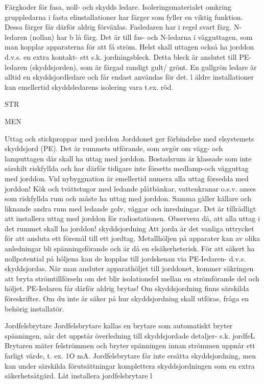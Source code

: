 Färgkoder för fasa, noll- och skydds ledare.
Isoleringsmaterialet omkring gruppledarna i
fasta elinstallationer har färger som fyller en
viktig funktion. Dessa färger får därför aldrig
förväxlas.
Fasledaren har i regel svart färg. N-ledaren (nollan) har b lå färg.
Det är till fas- och N-ledarna i vägguttagen, som man kopplar apparaterna för att få
ström. Helst skall uttagen också ha jorddon
d.v.s. en extra kontakt- ett s.k. jordningsbleck. Detta bleck är anslutet till PE-ledaren
(skyddsjorden), som är färgad randigt gult/
grönt.
En gullgrön ledare är alltid en skyddsjordledare och får endast användas för det.
l äldre installationer kan emellertid skyddsledarens isolering vara t.ex. röd.

STR

MEN

Uttag och stickproppar med jorddon
Jorddonet ger förbindelse med elsystemets
skyddsjord (PE).
Det är rummets utförande, som avgör om
vägg- och lamputtagen där skall ha uttag
med jorddon. Bostadsrum är klassade som
inte särskilt riskfyllda och har därför tidigare
inte försetts medlamp-och vägguttag med
jorddon. Vid nybyggnation är emellertid numera alla uttag försedda med jorddon!
Kök och tvättstugor med ledande plåtbänkar, vattenkranar o.s.v. anses som riskfyllda rum och måste ha uttag med jorddon.
Samma gäller källare och liknande andra
rum med ledande golv, väggar och inredningar.
Det är tillrådligt att installera uttag med
jorddon för radiostationen. Observera då, att
alla uttag i det rummet skall ha jorddon!
skyddsjordning
Att jorda är det vanliga uttrycket för att ansluta ett föremål till ett jordtag. Metallhöljen
på apparater kan av olika anledningar bli
spänningsförande och är då en elsäkerhetsrisk. För att säkert ha nollpotential på höljena
kan de kopplas till jordskenan via PE-Iedaren- d.v.s. skyddsjordas. När man ansluter
apparathöljet till jorddonet, kommer
säkringen att bryta strömtillförseln om det
blir isolationsfel mellan en strömförande del
och höljet. PE-Iedaren får därför aldrig brytas!
Om skyddsjordning finns särskilda föreskrifter. Om du inte är säker på hur skyddsjordning skall utföras, fråga en behörig installatör.

Jordfelsbrytare
Jordfelsbrytare kallas en brytare som automatiskt bryter spänningen, när det uppstår
överledning till skyddsjordade detaljer- s.k.
jordfeL Brytaren mäter felströmmen och bryter spänningen innan strömmen uppnår ett
farligt värde, t. ex. 1O mA. Jordfelsbrytare får
inte ersätta skyddsjordning, men kan under
särskilda förutsättningar komplettera
skyddsjordningen som en extra säkerhetsåtgärd. Låt installera jordfelsbrytare l

